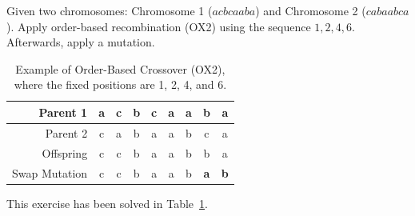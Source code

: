 \documentclass[12pt]{article}
\begin{document}
    \begin{ejercicio}
        Given two chromosomes: Chromosome 1 ($acbcaaba$) and Chromosome 2 ($cabaabca$). Apply order-based recombination (OX2) using the sequence $1,2,4,6$. Afterwards, apply a mutation.
        \begin{table}[ht]
            \centering
            \begin{tabular}{r|cccccccc}
                Parent 1 & a & c & b & c & a & a & b & a \\ \hline
                Parent 2 & c & a & b & a & a & b & c & a \\ \hline
                Offspring & c & c & b & a & a & b & b & a\\ \hline
                Swap Mutation & c & c & b & a & a & b & \textbf{a} & \textbf{b}
            \end{tabular}
            \caption{\centering Example of Order-Based Crossover (OX2), where the fixed positions are 1, 2, 4, and 6.}
            \label{tab:ox2_example}
        \end{table}
        
        This exercise has been solved in Table~\ref{tab:ox2_example}.
    \end{ejercicio}
\end{document}
